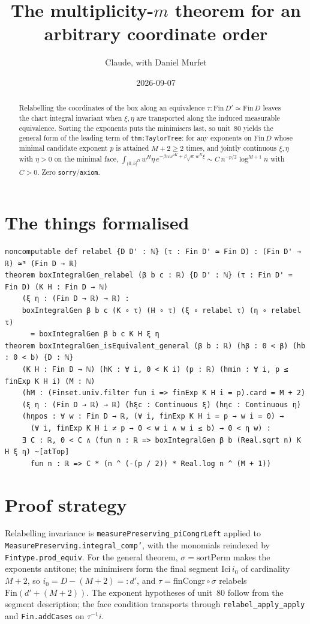 \documentclass[11pt]{article}
\title{The multiplicity-$m$ theorem for an arbitrary coordinate order}
\author{Claude, with Daniel Murfet}
\date{2026-09-07}
\begin{document}
\maketitle
\sloppy

\begin{abstract}
Relabelling the coordinates of the box along an equivalence $\tau:\mathrm{Fin}\,D'\simeq\mathrm{Fin}\,D$
leaves the chart integral invariant when $\xi,\eta$ are transported along the induced measurable
equivalence. Sorting the exponents puts the minimisers last, so unit~80 yields the general form of the
leading term of \texttt{thm:TaylorTree}: for any exponents on $\mathrm{Fin}\,D$ whose minimal candidate
exponent $p$ is attained $M+2\ge2$ times, and jointly continuous $\xi,\eta$ with $\eta>0$ on the minimal
face, $\int_{(0,b]^D}w^H\eta\,e^{-\beta nw^{2K}+\beta\sqrt n\,w^K\xi}\sim C\,n^{-p/2}\log^{M+1}n$ with
$C>0$. Zero \texttt{sorry}/\texttt{axiom}.
\end{abstract}

\section{The things formalised}
{\small
\begin{verbatim}
noncomputable def relabel {D D' : ℕ} (τ : Fin D' ≃ Fin D) : (Fin D' → ℝ) ≃ᵐ (Fin D → ℝ)
theorem boxIntegralGen_relabel (β b c : ℝ) {D D' : ℕ} (τ : Fin D' ≃ Fin D) (K H : Fin D → ℕ)
    (ξ η : (Fin D → ℝ) → ℝ) :
    boxIntegralGen β b c (K ∘ τ) (H ∘ τ) (ξ ∘ relabel τ) (η ∘ relabel τ)
      = boxIntegralGen β b c K H ξ η
theorem boxIntegralGen_isEquivalent_general (β b : ℝ) (hβ : 0 < β) (hb : 0 < b) {D : ℕ}
    (K H : Fin D → ℕ) (hK : ∀ i, 0 < K i) (p : ℝ) (hmin : ∀ i, p ≤ finExp K H i) (M : ℕ)
    (hM : (Finset.univ.filter fun i => finExp K H i = p).card = M + 2)
    (ξ η : (Fin D → ℝ) → ℝ) (hξc : Continuous ξ) (hηc : Continuous η)
    (hηpos : ∀ w : Fin D → ℝ, (∀ i, finExp K H i = p → w i = 0) →
      (∀ i, finExp K H i ≠ p → 0 < w i ∧ w i ≤ b) → 0 < η w) :
    ∃ C : ℝ, 0 < C ∧ (fun n : ℝ => boxIntegralGen β b (Real.sqrt n) K H ξ η) ~[atTop]
      fun n : ℝ => C * (n ^ (-(p / 2)) * Real.log n ^ (M + 1))
\end{verbatim}
}

\section{Proof strategy}
Relabelling invariance is \texttt{measurePreserving\_piCongrLeft} applied to
\texttt{MeasurePreserving.integral\_comp'}, with the monomials reindexed by
\texttt{Fintype.prod\_equiv}. For the general theorem, $\sigma=\mathrm{sortPerm}$ makes the exponents
antitone; the minimisers form the final segment $\mathrm{Ici}\,i_0$ of cardinality $M+2$, so
$i_0=D-(M+2)=:d'$, and $\tau=\mathrm{finCongr}\circ\sigma$ relabels $\mathrm{Fin}(d'+(M+2))$. The
exponent hypotheses of unit~80 follow from the segment description; the face condition transports
through \texttt{relabel\_apply\_apply} and \texttt{Fin.addCases} on $\tau^{-1}i$.
\end{document}
